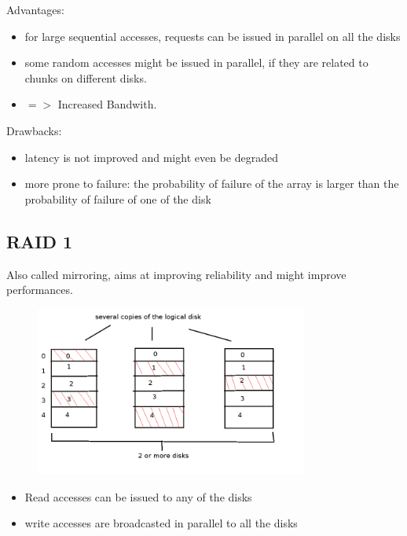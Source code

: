 Advantages:

\begin{itemize}
  \item for large sequential accesses, requests can be issued in parallel on all the disks
  \item some random accesses might be issued in parallel, if they are related to chunks on different disks.
  \item $=>$ Increased Bandwith.
\end{itemize}

Drawbacks:

\begin{itemize}
  \item latency is not improved and might even be degraded
  \item more prone to failure: the probability of failure of the array is larger than the probability of failure of one of the disk
\end{itemize}

\subsection{RAID 1}

Also called mirroring, aims at improving reliability and might improve performances.

\begin{figure}[h!]
  \begin{center}
    \includegraphics[width=0.8\textwidth]{raid_1.png}
    \caption{}
  \end{center}
\end{figure}

\begin{itemize}
  \item Read accesses can be issued to any of the disks
  \item write accesses are broadcasted in parallel to all the disks
\end{itemize}


